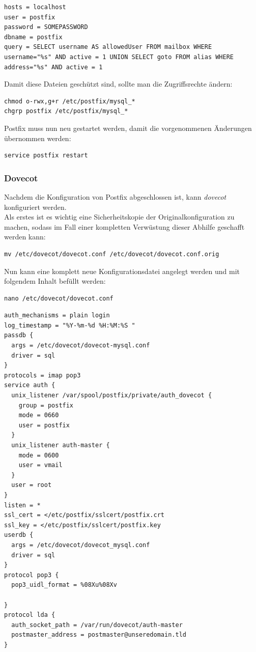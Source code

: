 \begin{lstlisting}
hosts = localhost
user = postfix
password = SOMEPASSWORD
dbname = postfix
query = SELECT username AS allowedUser FROM mailbox WHERE username="%s" AND active = 1 UNION SELECT goto FROM alias WHERE address="%s" AND active = 1
\end{lstlisting}

Damit diese Dateien geschützt sind, sollte man die Zugriffsrechte ändern:

\begin{lstlisting}
chmod o-rwx,g+r /etc/postfix/mysql_*
chgrp postfix /etc/postfix/mysql_*
\end{lstlisting}

Postfix muss nun neu gestartet werden, damit die vorgenommenen Änderungen übernommen werden:

\begin{lstlisting}
service postfix restart
\end{lstlisting}

\subsubsection{Dovecot}
Nachdem die Konfiguration von Postfix abgeschlossen ist, kann \textit{dovecot} konfiguriert werden. \\
Als erstes ist es wichtig eine Sicherheitskopie der Originalkonfiguration zu machen, sodass im Fall einer kompletten Verwüstung dieser Abhilfe geschafft werden kann:

\begin{lstlisting}
mv /etc/dovecot/dovecot.conf /etc/dovecot/dovecot.conf.orig
\end{lstlisting}

Nun kann eine komplett neue Konfigurationsdatei angelegt werden und mit folgendem Inhalt befüllt werden:

\begin{lstlisting}
nano /etc/dovecot/dovecot.conf
\end{lstlisting}

\begin{lstlisting}
auth_mechanisms = plain login
log_timestamp = "%Y-%m-%d %H:%M:%S "
passdb {
  args = /etc/dovecot/dovecot-mysql.conf
  driver = sql
}
protocols = imap pop3
service auth {
  unix_listener /var/spool/postfix/private/auth_dovecot {
    group = postfix
    mode = 0660
    user = postfix
  }
  unix_listener auth-master {
    mode = 0600
    user = vmail
  }
  user = root
}
listen = *
ssl_cert = </etc/postfix/sslcert/postfix.crt
ssl_key = </etc/postfix/sslcert/postfix.key
userdb {
  args = /etc/dovecot/dovecot_mysql.conf
  driver = sql
}
protocol pop3 {
  pop3_uidl_format = %08Xu%08Xv

}
protocol lda {
  auth_socket_path = /var/run/dovecot/auth-master
  postmaster_address = postmaster@unseredomain.tld
}
\end{lstlisting}

